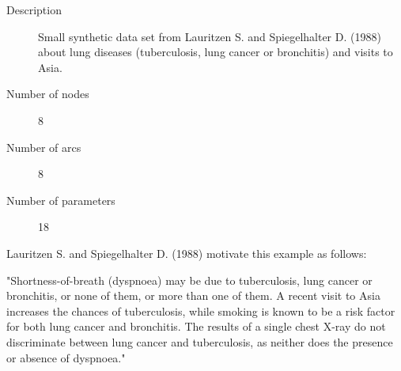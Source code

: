 \begin{description}
	\item[Description] Small synthetic data set from Lauritzen S. and Spiegelhalter D. (1988) about lung diseases (tuberculosis, lung cancer or bronchitis) and visits to Asia.

	\item[Number of nodes] 8
	
	\item[Number of arcs] 8
	
	\item[Number of parameters] 18
\end{description}

Lauritzen S. and Spiegelhalter D. (1988) motivate this example as follows:

"Shortness-of-breath (dyspnoea) may be due to tuberculosis, lung cancer or bronchitis, or none of them, or more than one of them. A recent visit to Asia increases the chances of tuberculosis, while smoking is known to be a risk factor for both lung cancer and bronchitis. The results of a single chest X-ray do not discriminate between lung cancer and tuberculosis, as neither does the presence or absence of dyspnoea."

